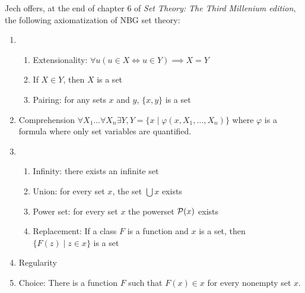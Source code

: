 \begin{node}
  Jech offers, at the end of chapter 6 of \textit{Set Theory: The Third Millenium edition},
  the following axiomatization of NBG set theory:
  \begin{enumerate}
  \item \begin{enumerate}
  \item Extensionality: $\forall u(u\in X\iff u\in Y)\implies X=Y$
  \item If $X\in Y$, then $X$ is a set
  \item Pairing: for any sets $x$ and $y$, $\{x,y\}$ is a set
  \end{enumerate}
  \item Comprehension $\forall X_{1}\dots\forall X_{n}\exists Y, Y=\{x\mid\varphi(x,X_{1},\dots,X_{n})\}$
    where $\varphi$ is a formula where only set variables are quantified.
  \item \begin{enumerate}
  \item Infinity: there exists an infinite set
  \item Union: for every set $x$, the set $\bigcup x$ exists
  \item Power set: for every set $x$ the powerset $\mathcal{P}(x)$ exists
  \item Replacement: If a class $F$ is a function and $x$ is a set, then
    $\{F(z)\mid z\in x\}$ is a set
  \end{enumerate}
  \item Regularity
  \item Choice: There is a function $F$ such that $F(x)\in x$ for every
    nonempty set $x$.
  \end{enumerate}
\end{node}
